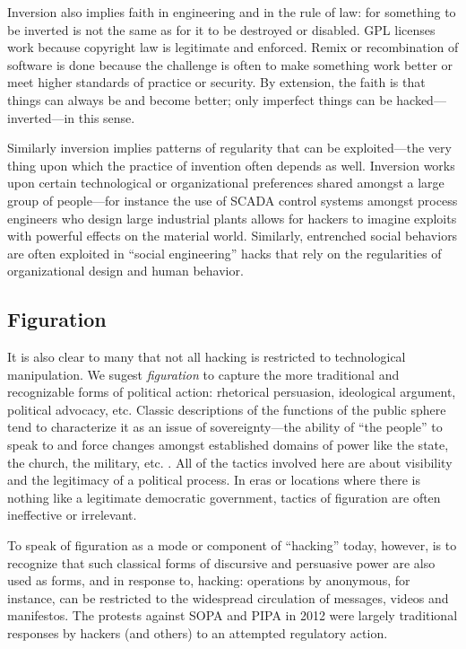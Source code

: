 \documentclass[10pt,letter,oneside]{scrartcl}
\begin{document}
Inversion also implies faith in engineering and in the rule of law: for
something to be inverted is not the same as for it to be destroyed or disabled.
GPL licenses work because copyright law is legitimate and enforced.  Remix or
recombination of software is done because the challenge is often to make
something work better or meet higher standards of practice or security.  By
extension, the faith is that things can always be and become better; only
imperfect things can be hacked--- inverted---in this sense.

Similarly inversion implies patterns of regularity that can be exploited---the
very thing upon which the practice of invention often depends as well.
Inversion works upon certain technological or organizational preferences shared
amongst a large group of people---for instance the use of SCADA control systems
amongst process engineers who design large industrial plants allows for hackers
to imagine exploits with powerful effects on the material world.  Similarly,
entrenched social behaviors are often exploited in ``social engineering'' hacks
that rely on the regularities of organizational design and human behavior.

\subsection*{Figuration}

It is also clear to many that not all hacking is restricted to technological
manipulation. We sugest \emph{figuration} to capture the more traditional and
recognizable forms of political action: rhetorical persuasion, ideological
argument, political advocacy, etc.  Classic descriptions of the functions of the
public sphere tend to characterize it as an issue of sovereignty---the ability
of ``the people'' to speak to and force changes amongst established domains of
power like the state, the church, the military,
etc. \cite{anderson2006imagined}.  All of the tactics involved here are about
visibility and the legitimacy of a political process.  In eras or locations
where there is nothing like a legitimate democratic government, tactics of
figuration are often ineffective or irrelevant.

To speak of figuration as a mode or component of ``hacking'' today, however, is
to recognize that such classical forms of discursive and persuasive power are
also used as forms, and in response to, hacking: operations by anonymous, for
instance, can be restricted to the widespread circulation of messages, videos
and manifestos. The protests against SOPA and PIPA in 2012 were largely
traditional responses by hackers (and others) to an attempted regulatory action.
\end{document}
